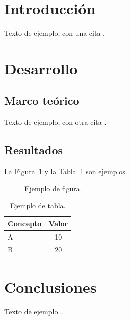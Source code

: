 \documentclass{ucshinforme}
\begin{document}
\makeportada

\begin{singlespace}
\tableofcontents
\clearpage
\listoffigures    %
\clearpage
\listoftables     %
\clearpage
\end{singlespace}

\section{Introducción}
Texto de ejemplo, con una cita \parencite{elmasri2016}.

\section{Desarrollo}
\subsection{Marco teórico}
Texto de ejemplo, con otra cita \parencite{date2019}.

\subsection{Resultados}
La Figura~\ref{fig:ejemplo} y la Tabla~\ref{tab:ejemplo} son ejemplos.

\begin{figure}[h]
  \centering
  \caption{Ejemplo de figura.}
  \label{fig:ejemplo}
\end{figure}

\begin{table}[h]
  \centering
  \begin{tabular}{lc}
    \hline
    Concepto & Valor \\
    \hline
    A & 10 \\
    B & 20 \\
    \hline
  \end{tabular}
  \caption{Ejemplo de tabla.}
  \label{tab:ejemplo}
\end{table}

\section{Conclusiones}
Texto de ejemplo...

\newpage
\printbibliography[heading=bibintoc,title=Referencias]
\end{document}
